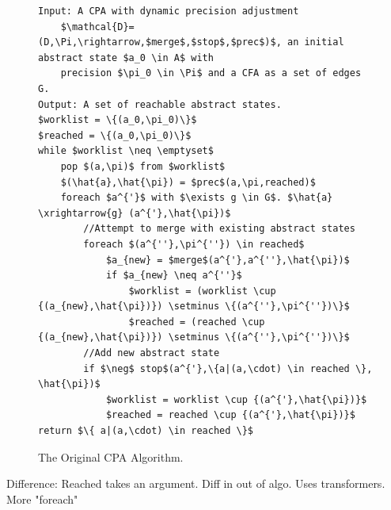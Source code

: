 \documentclass{kththesis}
\begin{document}
\begin{figure}[t]
    \centering
\begin{lstlisting}[style=algorithm]
Input: A CPA with dynamic precision adjustment 
    $\mathcal{D}=(D,\Pi,\rightarrow,$merge$,$stop$,$prec$)$, an initial abstract state $a_0 \in A$ with 
    precision $\pi_0 \in \Pi$ and a CFA as a set of edges G.
Output: A set of reachable abstract states.
$worklist = \{(a_0,\pi_0)\}$
$reached = \{(a_0,\pi_0)\}$
while $worklist \neq \emptyset$
    pop $(a,\pi)$ from $worklist$
    $(\hat{a},\hat{\pi}) = $prec$(a,\pi,reached)$
    foreach $a^{'}$ with $\exists g \in G$. $\hat{a} \xrightarrow{g} (a^{'},\hat{\pi})$
        //Attempt to merge with existing abstract states
        foreach $(a^{''},\pi^{''}) \in reached$
            $a_{new} = $merge$(a^{'},a^{''},\hat{\pi})$
            if $a_{new} \neq a^{''}$
                $worklist = (worklist \cup {(a_{new},\hat{\pi})}) \setminus \{(a^{''},\pi^{''})\}$
                $reached = (reached \cup {(a_{new},\hat{\pi})}) \setminus \{(a^{''},\pi^{''})\}$
        //Add new abstract state
        if $\neg$ stop$(a^{'},\{a|(a,\cdot) \in reached \}, \hat{\pi})$
            $worklist = worklist \cup {(a^{'},\hat{\pi})}$
            $reached = reached \cup {(a^{'},\hat{\pi})}$
return $\{ a|(a,\cdot) \in reached \}$
\end{lstlisting}
\caption[The original CPA Algorithm.]{The Original CPA Algorithm.}
    \label{fig:CPAJakstab}
\end{figure}

Difference: Reached takes an argument. Diff in out of algo. Uses transformers. More "foreach"
\end{document}
